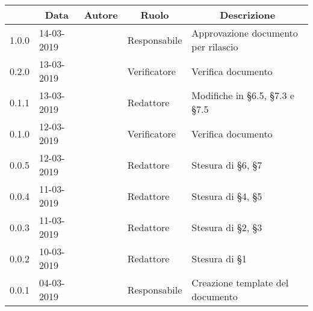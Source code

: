\pagestyle{styleDocPages}

\begin{center}
	\renewcommand{\arraystretch}{2.8}
	\begin{longtable}[H]{p{1.7cm} p{2cm} p{1.8cm} p{2.5cm} p{4cm}}
\rowcolor[HTML]{232f3e}
\multicolumn{1}{c}{\color[HTML]{FFFFFF} \textbf{Versione}} & 
\multicolumn{1}{c}{\color[HTML]{FFFFFF} \textbf{Data}} & 
\multicolumn{1}{c}{\color[HTML]{FFFFFF} \textbf{Autore}} & 
\multicolumn{1}{c}{\color[HTML]{FFFFFF} \textbf{Ruolo}} & 
\multicolumn{1}{c}{\color[HTML]{FFFFFF} \textbf{Descrizione}} \\
\endhead
1.0.0 & 14-03-2019 & \andrea{} & Responsabile & Approvazione documento per rilascio\\
0.2.0 & 13-03-2019 & \francesco{} & Verificatore & Verifica documento\\
0.1.1 & 13-03-2019 & \giacomo{} & Redattore & Modifiche in §6.5, §7.3 e §7.5\\
0.1.0 & 12-03-2019 & \daniele{} & Verificatore & Verifica documento\\
0.0.5 & 12-03-2019 & \giacomo{} & Redattore & Stesura di §6, §7\\
0.0.4 & 11-03-2019 & \davide{} & Redattore & Stesura di §4, §5\\
0.0.3 & 11-03-2019 & \singh{} & Redattore & Stesura di §2, §3\\
0.0.2 & 10-03-2019 & \davide{} & Redattore & Stesura di §1\\
0.0.1 & 04-03-2019 & \andrea{} & Responsabile & Creazione template del documento\\

\end{longtable}
\end{center}